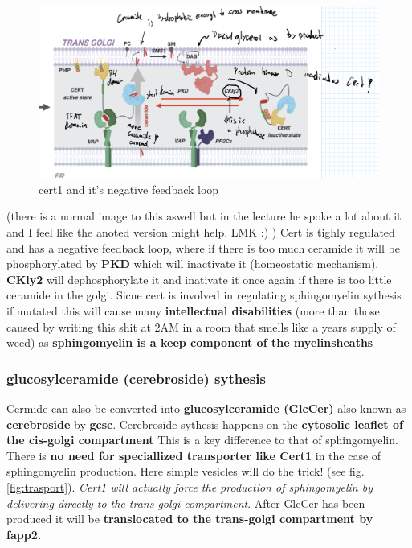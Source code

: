 \documentclass[../main.tex]{subfiles}
\begin{document}
\begin{figure}[H]
    \centering
    \includegraphics[width=\linewidth]{cert1_2_annotated.png}
    \caption{cert1 and it's negative feedback loop}
    \label{fig:enter-label}
\end{figure}
(there is a normal image to this aswell but in the lecture he spoke a lot about it and I feel like the anoted version might help. LMK :) )
Cert is tighly regulated and has a negative feedback loop, where if there is too much ceramide it will be phosphorylated by \textbf{PKD} which will inactivate it (homeostatic mechanism). \textbf{CKly2} will dephosphorylate it and inativate it once again if there is too little ceramide in the golgi. Sicne cert is involved in regulating sphingomyelin sythesis if mutated this will cause many \textbf{intellectual disabilities} (more than those caused by writing this shit at 2AM in a room that smells like a years supply of weed) as \textbf{sphingomyelin is a keep component of the myelinsheaths}

\subsubsection{glucosylceramide (cerebroside) sythesis}

Cermide can also be converted into \textbf{glucosylceramide (GlcCer)} also known as \textbf{\gls{cerebroside}} by \textbf{\gls{gcsc}}. Cerebroside sythesis happens on the\textbf{ cytosolic leaflet of the cis-golgi compartment} This is a key difference to that of sphingomyelin. There is \textbf{no need for speciallized transporter like Cert1} in the case of sphingomyelin production. Here simple vesicles will do the trick! (see fig. \ref{fig:trasport}). \textit{Cert1 will actually force the production of sphingomyelin by delivering directly to the trans golgi compartment}. After GlcCer has been produced it will be \textbf{translocated to the trans-golgi compartment by \gls{fapp2}.}
\end{document}
